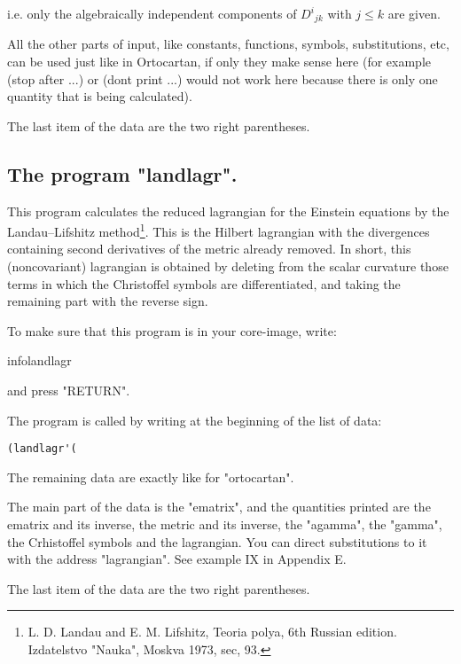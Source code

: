 \noindent i.e. only the algebraically independent components of ${D^i}_{jk}$
with $j \leq k$ are given.

All the other parts of input, like constants, functions, symbols,
substitutions, etc, can be used just like in Ortocartan, if only they make
sense here (for example (stop after ...) or (dont print ...) would not work
here because there is only one quantity that is being calculated).

The last item of the data are the two right parentheses.

\subsection{The program "landlagr".}

This program calculates the reduced lagrangian for the Einstein equations by
the Landau--Lifshitz method\footnote{L. D. Landau and E. M. Lifshitz, Teoria
polya, 6th Russian edition. Izdatelstvo "Nauka", Moskva 1973, sec, 93.}. This
is the Hilbert lagrangian with the divergences containing second derivatives of
the metric already removed. In short, this (noncovariant) lagrangian is
obtained by deleting from the scalar curvature those terms in which the
Christoffel symbols are differentiated, and taking the remaining part with the
reverse sign.

To make sure that this program is in your core-image, write:

\bigskip

infolandlagr

\bigskip

\noindent and press "RETURN".

The program is called by writing at the beginning of the list of data:

\bigskip

\begin{verbatim}
(landlagr'(
\end{verbatim}

\bigskip

\noindent The remaining data are exactly like for "ortocartan".

The main part of the data is the "ematrix", and the quantities printed are the
ematrix and its inverse, the metric and its inverse, the "agamma", the "gamma",
the Crhistoffel symbols and the lagrangian. You can direct substitutions to it
with the address "lagrangian". See example IX in Appendix E.

The last item of the data are the two right parentheses.

